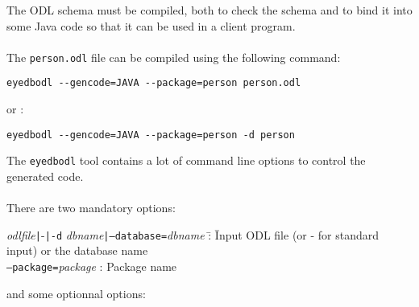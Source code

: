The ODL schema must be compiled, both to check the schema and to bind
it into some Java code so that it can be used in a client program.
\\
\\
The \texttt{person.odl} file can be compiled using the following command:
\begin{verbatim}
eyedbodl --gencode=JAVA --package=person person.odl
\end{verbatim}
or :
\begin{verbatim}
eyedbodl --gencode=JAVA --package=person -d person
\end{verbatim}
The \texttt{eyedbodl} tool contains a lot of command line options to
control the generated code.
\\
\\
There are two mandatory options:\\
\begin{tabbing}
\emph{odlfile}\texttt{|}-\texttt{|}\texttt{-d} \emph{dbname}\texttt{|}\texttt{--database=}\emph{dbname} \= : \= Input ODL file (or - for standard input) or the database name\\
\texttt{--package=}\emph{package}          \> : \> Package name\\
\end{tabbing}
and some optionnal options:
